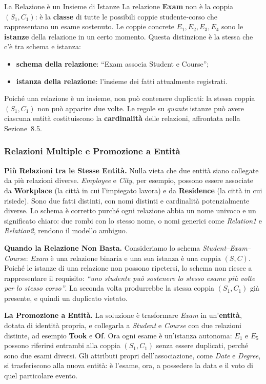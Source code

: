 \documentclass[12pt]{extarticle}
\begin{document}
\begin{cbox}{La Relazione è un Insieme di Istanze}
\noindent La relazione \textbf{Exam} non è la coppia $(S_1, C_1)$: è la \textbf{classe} di tutte le possibili coppie studente-corso che rappresentano un esame sostenuto. Le coppie concrete $E_1, E_2, E_3, E_4$ sono le \textbf{istanze} della relazione in un certo momento. Questa distinzione è la stessa che c'è tra schema e istanza:
\begin{itemize}
    \item \textbf{schema della relazione}: ``Exam associa Student e Course'';
    \item \textbf{istanza della relazione}: l'insieme dei fatti attualmente registrati.
\end{itemize}
Poiché una relazione è un insieme, non può contenere duplicati: la stessa coppia $(S_1, C_1)$ non può apparire due volte. Le regole su \textit{quante} istanze può avere ciascuna entità costituiscono la \textbf{cardinalità} delle relazioni, affrontata nella Sezione~8.5.
\end{cbox}

\subsubsection{Relazioni Multiple e Promozione a Entità}

\noindent \textbf{Più Relazioni tra le Stesse Entità.} Nulla vieta che due entità siano collegate da più relazioni diverse. \textit{Employee} e \textit{City}, per esempio, possono essere associate da \textbf{Workplace} (la città in cui l'impiegato lavora) e da \textbf{Residence} (la città in cui risiede). Sono due fatti distinti, con nomi distinti e cardinalità potenzialmente diverse. Lo schema è corretto purché ogni relazione abbia un nome univoco e un significato chiaro: due rombi con lo stesso nome, o nomi generici come \textit{Relation1} e \textit{Relation2}, rendono il modello ambiguo.

\medskip
\noindent \textbf{Quando la Relazione Non Basta.} Consideriamo lo schema \textit{Student}--\textit{Exam}--\textit{Course}: \textit{Exam} è una relazione binaria e una sua istanza è una coppia $(S, C)$. Poiché le istanze di una relazione non possono ripetersi, lo schema non riesce a rappresentare il requisito: \textit{``uno studente può sostenere lo stesso esame più volte per lo stesso corso''}. La seconda volta produrrebbe la stessa coppia $(S_1, C_1)$ già presente, e quindi un duplicato vietato.

\medskip
\noindent \textbf{La Promozione a Entità.} La soluzione è trasformare \textit{Exam} in un'\textbf{entità}, dotata di identità propria, e collegarla a \textit{Student} e \textit{Course} con due relazioni distinte, ad esempio \textbf{Took} e \textbf{Of}. Ora ogni esame è un'istanza autonoma: $E_1$ e $E_5$ possono riferirsi entrambi alla coppia $(S_1, C_1)$ senza essere duplicati, perché sono due esami diversi. Gli attributi propri dell'associazione, come \textit{Date} e \textit{Degree}, si trasferiscono alla nuova entità: è l'esame, ora, a possedere la data e il voto di quel particolare evento.
\end{document}
